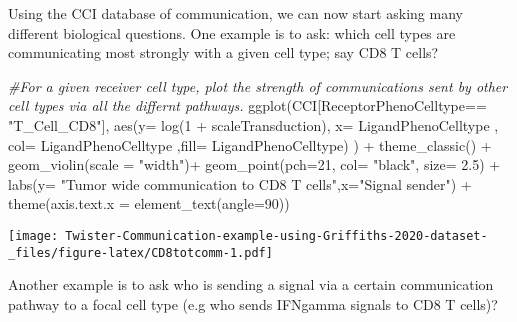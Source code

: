 \documentclass[
]{article}
\newenvironment{Shaded}{\begin{snugshade}}{\end{snugshade}}
\newcommand{\AttributeTok}[1]{\textcolor[rgb]{0.77,0.63,0.00}{#1}}
\newcommand{\CommentTok}[1]{\textcolor[rgb]{0.56,0.35,0.01}{\textit{#1}}}
\newcommand{\DecValTok}[1]{\textcolor[rgb]{0.00,0.00,0.81}{#1}}
\newcommand{\FloatTok}[1]{\textcolor[rgb]{0.00,0.00,0.81}{#1}}
\newcommand{\FunctionTok}[1]{\textcolor[rgb]{0.00,0.00,0.00}{#1}}
\newcommand{\NormalTok}[1]{#1}
\newcommand{\SpecialCharTok}[1]{\textcolor[rgb]{0.00,0.00,0.00}{#1}}
\newcommand{\StringTok}[1]{\textcolor[rgb]{0.31,0.60,0.02}{#1}}
\begin{document}
Using the CCI database of communication, we can now start asking many
different biological questions. One example is to ask: which cell types
are communicating most strongly with a given cell type; say CD8 T cells?

\begin{Shaded}
\begin{Highlighting}[]
\CommentTok{\#For a given receiver cell type, plot the strength of communications sent by other cell types via all the differnt pathways.}
\FunctionTok{ggplot}\NormalTok{(CCI[ReceptorPhenoCelltype}\SpecialCharTok{==} \StringTok{"T\_Cell\_CD8"}\NormalTok{],}
       \FunctionTok{aes}\NormalTok{(}\AttributeTok{y=} \FunctionTok{log}\NormalTok{(}\DecValTok{1} \SpecialCharTok{+}\NormalTok{ scaleTransduction), }\AttributeTok{x=}\NormalTok{ LigandPhenoCelltype , }\AttributeTok{col=}\NormalTok{ LigandPhenoCelltype ,}\AttributeTok{fill=}\NormalTok{ LigandPhenoCelltype) ) }\SpecialCharTok{+} \FunctionTok{theme\_classic}\NormalTok{() }\SpecialCharTok{+}
  \FunctionTok{geom\_violin}\NormalTok{(}\AttributeTok{scale =} \StringTok{"width"}\NormalTok{)}\SpecialCharTok{+}
  \FunctionTok{geom\_point}\NormalTok{(}\AttributeTok{pch=}\DecValTok{21}\NormalTok{, }\AttributeTok{col=} \StringTok{"black"}\NormalTok{, }\AttributeTok{size=} \FloatTok{2.5}\NormalTok{) }\SpecialCharTok{+}
  \FunctionTok{labs}\NormalTok{(}\AttributeTok{y=} \StringTok{"Tumor wide communication to CD8 T cells"}\NormalTok{,}\AttributeTok{x=}\StringTok{"Signal sender"}\NormalTok{) }\SpecialCharTok{+}
  \FunctionTok{theme}\NormalTok{(}\AttributeTok{axis.text.x =} \FunctionTok{element\_text}\NormalTok{(}\AttributeTok{angle=}\DecValTok{90}\NormalTok{))}
\end{Highlighting}
\end{Shaded}

\texttt{[image: Twister-Communication-example-using-Griffiths-2020-dataset-\_files/figure-latex/CD8totcomm-1.pdf]}

Another example is to ask who is sending a signal via a certain
communication pathway to a focal cell type (e.g who sends IFNgamma
signals to CD8 T cells)?
\end{document}
